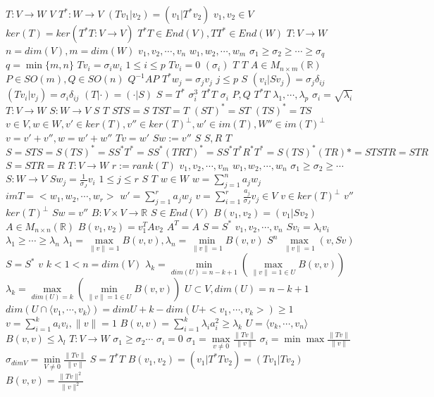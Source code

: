 \documentclass{article}
\begin{document}
$T:V \rightarrow W$
$V$
$T^*:W \rightarrow V$
$(Tv_1|v_2)=(v_1|T^*v_2)$
$v_1,v_2 \in V$
$ker(T)=ker(T^*T:V \rightarrow V)$
$T^*T \in End(V),TT^* \in End(W)$
$T:V \rightarrow W$
$n=dim(V),m=dim(W)$
$v_1,v_2, \cdots,v_n$
$w_1,w_2,\cdots,w_m$
$\sigma_1\geq\sigma_2\geq\cdots\geq\sigma_q$
$q=\min\{m,n\}$
$Tv_i=\sigma_i w_i$
$1 \leq i \leq p$
$Tv_i=0$
$(\sigma_i)$
$T$
$T$
$A \in M_{n \times m}(\mathbb{R})$
$P \in SO(m),Q\in SO(n)$
$Q^{-1}AP$
$T^*w_j=\sigma_jv_j$
$j \leq p$
$S$
$(v_i|Sv_j)=\sigma_j \delta_{ij}$
$(Tv_i|v_j)=\sigma_i\delta_{ij}$
$(T|\cdot)=(\cdot|S)$
$S=T^*$
$\sigma_i^3$
$T^*T$
$\sigma_i$
$P,Q$
$T^*T$
$\lambda_1,\cdots,\lambda_p$
$\sigma_i=\sqrt{\lambda_i}$
$T:V \rightarrow W$
$S:W \rightarrow V$
$S$
$T$
$STS=S$
$TST=T$
$(ST)^*=ST$
$(TS)^*=TS$
$v \in V, w \in W, v' \in ker(T), v'' \in ker(T)^{\perp}, w' \in im(T), W'' \in im(T)^\perp$
$v=v'+v'',w=w'+w''$
$Tv=w'$
$Sw:=v''$
$S$
$S,R$
$T$
$$
S=STS=S(TS)^*=SS^*T^*=SS^*(TRT)^*=SS^*T^*R^*T^*=S(TS)^*(TR)*=STSTR=STR
$$
$S=STR=R$
$T:V \rightarrow W$
$r:=rank(T)$
$v_1,v_2, \cdots, v_m$
$w_1,w_2, \cdots, w_n$
$\sigma_1\geq\sigma_2\geq\cdots$
$S:W \rightarrow V$
$Sw_j=\frac{1}{\sigma_J}v_i$
$1 \leq j \leq r$
$S$
$T$
$w \in W$
$w=\sum\limits_{j=1}^{n}a_jw_j$
$imT=<w_1,w_2, \cdots, w_r>$
$w'=\sum\limits_{j=1}^{r}a_jw_j$
$v=\sum\limits_{i=1}^{r}\frac{a_j}{\sigma_J}v_j \in V$
$v \in ker(T)^{\perp}$
$v''$
$ker(T)^{\perp}$
$Sw=v''$
$B:V\times V \rightarrow \mathbb{R}$
$S \in End(V)$
$B(v_1,v_2)=(v_1|Sv_2)$
$A \in M_{n \times n}(\mathbb{R})$
$B(v_1,v_2)=v_1^{T}Av_2$
$A^T=A$
$S=S^*$
$v_1,v_2,\cdots,v_n$
$Sv_i=\lambda_iv_i$
$\lambda_1\geq\cdots\geq\lambda_n$
$\lambda_1=\max\limits_{\lVert v \rVert=1} B(v,v), \lambda_n=\min\limits_{\lVert v \rVert=1} B(v,v)$
$S^n$
$\max\limits_{\lVert v \rVert=1} (v,Sv)$
$S=S^*$
$v$
$k<1<n=dim(V)$
$\lambda_k=\min\limits_{dim(U)=n-k+1}(\max\limits_{\lVert v \rVert=1 \in U}B(v,v))$
$\lambda_k=\max\limits_{dim(U)=k}(\min\limits_{\lVert v \rVert=1 \in U}B(v,v))$
$U \subset V, dim(U)=n-k+1$
$dim(U \cap \langle v_1,\cdots,v_k \rangle)=dimU+k-dim(U+<v_1,\cdots,v_k>)\geq 1$
$v=\sum\limits_{i=1}^{k}a_iv_i, \lVert v \rVert=1$
$B(v,v)=\sum\limits_{i=1}^{k}\lambda_ia_i^2 \geq\lambda_k$
$U=\langle v_k,\cdots,v_n \rangle$
$B(v,v) \leq \lambda_l$
$T:V\rightarrow W$
$\sigma_1\geq\sigma_2\cdots$
$\sigma_i=0$
$\sigma_1=\max\limits_{v \neq 0} \frac{\lVert Tv \rVert}{\lVert v \rVert}$
$\sigma_i=\min\max\frac{\lVert Tv \rVert}{\lVert v \rVert}$
$\sigma_{dimV}=\min\limits_{V\neq0}\frac{\lVert Tv \rVert}{\lVert v \rVert}$
$S=T^*T$
$B(v_1,v_2)=(v_1|T^*Tv_2)=(Tv_1|Tv_2)$
$B(v,v)=\frac{\lVert Tv \rVert^2}{\lVert v \rVert^2}$
\end{document}
